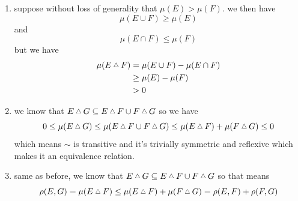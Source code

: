 \documentclass{article}
\begin{document}
\begin{homeworkProblem}
    \begin{enumerate}[label=\alph*.]
        \item suppose without loss of generality that $\mu(E)>\mu(F)$. we then have
        $$
        \mu(E\cup F)\geq\mu(E)
        $$
        and
        $$
        \mu(E\cap F)\leq \mu(F)
        $$
        but we have
        \begin{align*}
            \mu(E\symdiff F) &= \mu(E\cup F)-\mu(E\cap F) \\
            &\geq \mu(E)-\mu(F) \\
            &>0
        \end{align*}
        \item we know that $E\symdiff G\subseteq E\symdiff F\cup F\symdiff G$ so we have
        \[
        0 \leq \mu(E \symdiff G) \leq \mu(E \symdiff F \cup F \symdiff G)\leq \mu(E\symdiff F) + \mu(F\symdiff G)\leq 0 
        \]
        which means \(\sim\) is transitive and it's trivially symmetric and reflexive which makes it an equivalence relation.
        \item same as before, we know that \(E \symdiff G \subseteq E \symdiff F \cup F \symdiff G\) so that means
        \[
        \rho(E, G) = \mu(E \symdiff F) 
        \leq \mu(E \symdiff F) + \mu(F \symdiff G)
        = \rho(E, F) + \rho(F, G)
        \]
    \end{enumerate}
\end{homeworkProblem}
\end{document}
